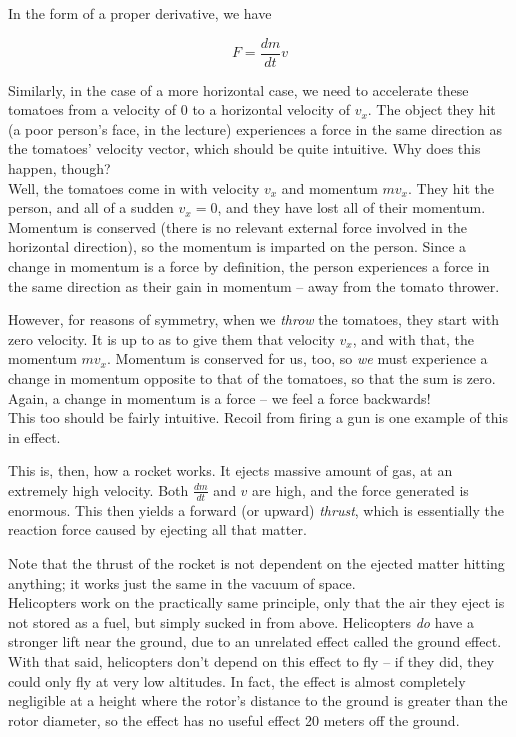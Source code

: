 \documentclass[12pt,a4paper]{report}
\begin{document}
In the form of a proper derivative, we have

\begin{equation}
F = \frac{dm}{dt} v
\end{equation}

Similarly, in the case of a more horizontal case, we need to accelerate these tomatoes from a velocity of 0 to a horizontal velocity of $v_x$. The object they hit (a poor person's face, in the lecture) experiences a force in the same direction as the tomatoes' velocity vector, which should be quite intuitive. Why does this happen, though?\\
Well, the tomatoes come in with velocity $v_x$ and momentum $m v_x$. They hit the person, and all of a sudden $v_x = 0$, and they have lost all of their momentum. Momentum is conserved (there is no relevant external force involved in the horizontal direction), so the momentum is imparted on the person. Since a change in momentum is a force by definition, the person experiences a force in the same direction as their gain in momentum -- away from the tomato thrower.

However, for reasons of symmetry, when we \emph{throw} the tomatoes, they start with zero velocity. It is up to as to give them that velocity $v_x$, and with that, the momentum $m v_x$. Momentum is conserved for us, too, so \emph{we} must experience a change in momentum opposite to that of the tomatoes, so that the sum is zero. Again, a change in momentum is a force -- we feel a force backwards!\\
This too should be fairly intuitive. Recoil from firing a gun is one example of this in effect.

This is, then, how a rocket works. It ejects massive amount of gas, at an extremely high velocity. Both $\displaystyle \frac{dm}{dt}$ and $v$ are high, and the force generated is enormous. This then yields a forward (or upward) \emph{thrust}, which is essentially the reaction force caused by ejecting all that matter.

Note that the thrust of the rocket is not dependent on the ejected matter hitting anything; it works just the same in the vacuum of space.\\
Helicopters work on the practically same principle, only that the air they eject is not stored as a fuel, but simply sucked in from above. Helicopters \emph{do} have a stronger lift near the ground, due to an unrelated effect called the ground effect. With that said, helicopters don't depend on this effect to fly -- if they did, they could only fly at very low altitudes. In fact, the effect is almost completely negligible at a height where the rotor's distance to the ground is greater than the rotor diameter, so the effect has no useful effect 20 meters off the ground.
\end{document}
